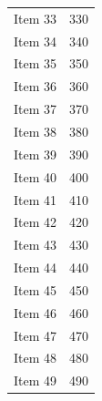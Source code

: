 \documentclass[11pt,a4paper]{report}
\begin{document}
\begin{longtable}{|l|l|}
Item 33 & 330 \\
Item 34 & 340 \\
Item 35 & 350 \\
Item 36 & 360 \\
Item 37 & 370 \\
Item 38 & 380 \\
Item 39 & 390 \\
Item 40 & 400 \\
Item 41 & 410 \\
Item 42 & 420 \\
Item 43 & 430 \\
Item 44 & 440 \\
Item 45 & 450 \\
Item 46 & 460 \\
Item 47 & 470 \\
Item 48 & 480 \\
Item 49 & 490 \\
\end{longtable}
\vspace{4.0mm}
\end{document}
